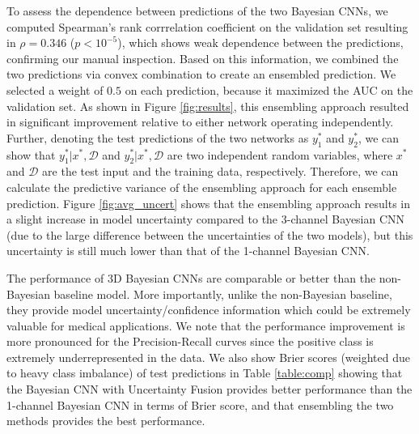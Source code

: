 \documentclass{article}
\begin{document}
To assess the dependence between predictions of the two Bayesian CNNs, we computed Spearman's rank corrrelation coefficient on the validation set resulting in $\rho=0.346$ ($p<10^{-5}$), which shows weak dependence between the predictions, confirming our manual inspection. Based on this information, we combined the two predictions via convex combination to create an ensembled prediction. We selected a weight of $0.5$ on each prediction, because it maximized the AUC on the validation set. As shown in Figure \ref{fig:results}, this ensembling approach resulted in significant improvement relative to either network operating independently. Further, denoting the test predictions of the two networks as $y_1^*$ and $y_2^*$, we can show that $y_1^*|x^*,\mathcal{D}$ and $y_2^*|x^*,\mathcal{D}$ are two independent random variables, where $x^*$ and $\mathcal{D}$ are the test input and the training data, respectively. Therefore, we can calculate the predictive variance of the ensembling approach for each ensemble prediction. 
Figure \ref{fig:avg_uncert} shows that the ensembling approach results in a slight increase in model uncertainty compared to the 3-channel Bayesian CNN (due to the large difference between the uncertainties of the two models), but this uncertainty is still much lower than that of the 1-channel Bayesian CNN. 

The performance of 3D Bayesian CNNs are comparable or better than the non-Bayesian baseline model. More importantly, unlike the non-Bayesian baseline, they provide model uncertainty/confidence information which could be extremely valuable for medical applications. We note that the performance improvement is more pronounced for the Precision-Recall curves since the positive class is extremely underrepresented in the data. 
We also show Brier scores \cite{deGroot83} (weighted due to heavy class imbalance) of test predictions in Table \ref{table:comp} 
showing that the Bayesian CNN with Uncertainty Fusion provides better performance than the 1-channel Bayesian CNN in terms of Brier score, and that ensembling the two methods provides the best performance. 


\end{document}
